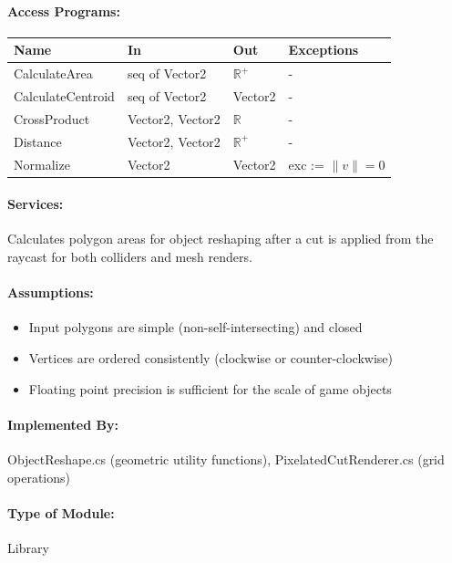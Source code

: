 \documentclass[12pt, titlepage]{article}
\begin{document}
\paragraph{Access Programs:}

\begin{center}
\begin{tabular}{p{35mm}p{3cm}p{2cm}p{3cm}}
\toprule
\textbf{Name} & \textbf{In} & \textbf{Out} & \textbf{Exceptions} \\
\midrule
CalculateArea & seq of Vector2 & $\mathbb{R}^+$ & - \\
CalculateCentroid & seq of Vector2 & Vector2 & - \\
CrossProduct & Vector2, Vector2 & $\mathbb{R}$ & - \\
Distance & Vector2, Vector2 & $\mathbb{R}^+$ & - \\
Normalize & Vector2 & Vector2 & exc := $\|v\| = 0$ \\
\bottomrule
\end{tabular}
\end{center}

\paragraph{Services:}
Calculates polygon areas for object reshaping after a cut is applied from the raycast for both colliders and mesh renders.

\paragraph{Assumptions:}
\begin{itemize}
\item Input polygons are simple (non-self-intersecting) and closed
\item Vertices are ordered consistently (clockwise or counter-clockwise)
\item Floating point precision is sufficient for the scale of game objects
\end{itemize}

\paragraph{Implemented By:}
ObjectReshape.cs (geometric utility functions), PixelatedCutRenderer.cs (grid operations)

\paragraph{Type of Module:}
Library
\end{document}
